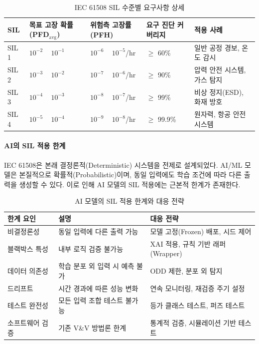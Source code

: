\begin{table}[htbp]
\centering
\caption{IEC 61508 SIL 수준별 요구사항 상세}
\label{tab:19_sil_detail}
\begin{tabularx}{\textwidth}{p{1cm}p{2.5cm}p{2.5cm}Xp{2.5cm}}
\toprule
\textbf{SIL} & \textbf{목표 고장 확률 (PFD$_\text{avg}$)} & \textbf{위험측 고장률 (PFH)} & \textbf{요구 진단 커버리지} & \textbf{적용 사례} \\
\midrule
SIL 1 & $10^{-2}$ ~ $10^{-1}$ & $10^{-6}$ ~ $10^{-5}$/hr & $\geq$ 60\% & 일반 공정 경보, 온도 감시 \\
SIL 2 & $10^{-3}$ ~ $10^{-2}$ & $10^{-7}$ ~ $10^{-6}$/hr & $\geq$ 90\% & 압력 안전 시스템, 가스 탐지 \\
SIL 3 & $10^{-4}$ ~ $10^{-3}$ & $10^{-8}$ ~ $10^{-7}$/hr & $\geq$ 99\% & 비상 정지(ESD), 화재 방호 \\
SIL 4 & $10^{-5}$ ~ $10^{-4}$ & $10^{-9}$ ~ $10^{-8}$/hr & $\geq$ 99.9\% & 원자력, 항공 안전 시스템 \\
\bottomrule
\end{tabularx}
\end{table}

\paragraph{AI의 SIL 적용 한계}

IEC 61508은 본래 결정론적(Deterministic) 시스템을 전제로 설계되었다. AI/ML 모델은 본질적으로 확률적(Probabilistic)이며, 동일 입력에도 학습 조건에 따라 다른 출력을 생성할 수 있다. 이로 인해 AI 모델의 SIL 적용에는 근본적 한계가 존재한다.

\begin{table}[htbp]
\centering
\caption{AI 모델의 SIL 적용 한계와 대응 전략}
\label{tab:19_ai_sil_limits}
\begin{tabularx}{\textwidth}{p{3cm}Xp{4.5cm}}
\toprule
\textbf{한계 요인} & \textbf{설명} & \textbf{대응 전략} \\
\midrule
비결정론성 & 동일 입력에 다른 출력 가능 & 모델 고정(Frozen) 배포, 시드 제어 \\
블랙박스 특성 & 내부 로직 검증 불가능 & XAI 적용, 규칙 기반 래퍼(Wrapper) \\
데이터 의존성 & 학습 분포 외 입력 시 예측 불가 & ODD 제한, 분포 외 탐지 \\
드리프트\cite{paleyes2022challenges} & 시간 경과에 따른 성능 변화 & 연속 모니터링, 재검증 주기 설정 \\
테스트 완전성 & 모든 입력 조합 테스트 불가능 & 등가 클래스 테스트, 퍼즈 테스트 \\
소프트웨어 검증 & 기존 V\&V 방법론 한계 & 통계적 검증, 시뮬레이션 기반 테스트 \\
\bottomrule
\end{tabularx}
\end{table}

